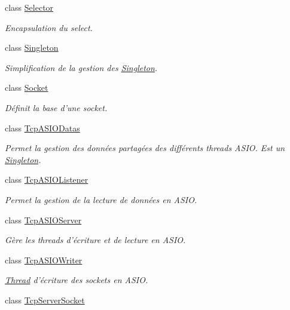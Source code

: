 \begin{DoxyCompactItemize}
class \hyperlink{classmognetwork_1_1_selector}{Selector}
\begin{DoxyCompactList}\small\item\em Encapsulation du select. \end{DoxyCompactList}\item 
class \hyperlink{classmognetwork_1_1_singleton}{Singleton}
\begin{DoxyCompactList}\small\item\em Simplification de la gestion des \hyperlink{classmognetwork_1_1_singleton}{Singleton}. \end{DoxyCompactList}\item 
class \hyperlink{classmognetwork_1_1_socket}{Socket}
\begin{DoxyCompactList}\small\item\em Définit la base d'une socket. \end{DoxyCompactList}\item 
class \hyperlink{classmognetwork_1_1_tcp_a_s_i_o_datas}{Tcp\-A\-S\-I\-O\-Datas}
\begin{DoxyCompactList}\small\item\em Permet la gestion des données partagées des différents threads A\-S\-I\-O. Est un \hyperlink{classmognetwork_1_1_singleton}{Singleton}. \end{DoxyCompactList}\item 
class \hyperlink{classmognetwork_1_1_tcp_a_s_i_o_listener}{Tcp\-A\-S\-I\-O\-Listener}
\begin{DoxyCompactList}\small\item\em Permet la gestion de la lecture de données en A\-S\-I\-O. \end{DoxyCompactList}\item 
class \hyperlink{classmognetwork_1_1_tcp_a_s_i_o_server}{Tcp\-A\-S\-I\-O\-Server}
\begin{DoxyCompactList}\small\item\em Gère les threads d'écriture et de lecture en A\-S\-I\-O. \end{DoxyCompactList}\item 
class \hyperlink{classmognetwork_1_1_tcp_a_s_i_o_writer}{Tcp\-A\-S\-I\-O\-Writer}
\begin{DoxyCompactList}\small\item\em \hyperlink{classmognetwork_1_1_thread}{Thread} d'écriture des sockets en A\-S\-I\-O. \end{DoxyCompactList}\item 
class \hyperlink{classmognetwork_1_1_tcp_server_socket}{Tcp\-Server\-Socket}

\end{DoxyCompactItemize}
